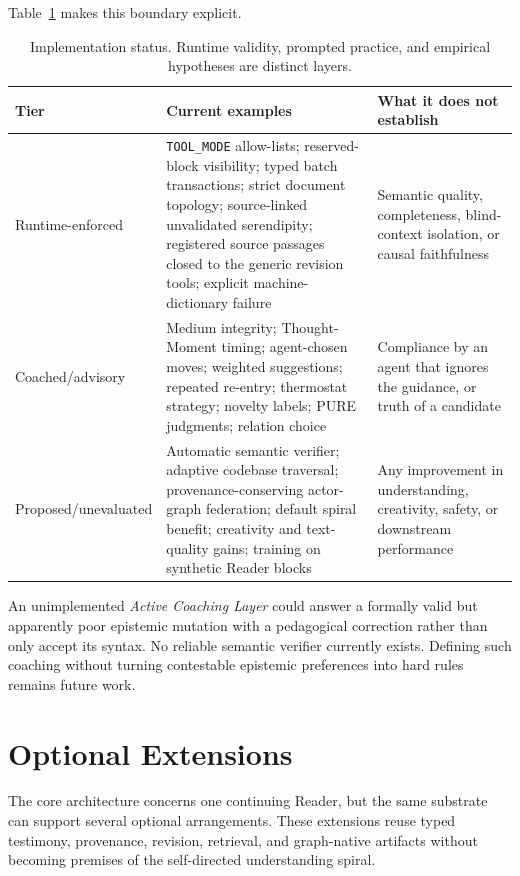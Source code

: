 Table~\ref{tab:implementation-status} makes this boundary explicit.

\begin{table}[H]
\centering
\begin{tabularx}{\columnwidth}{lXX}
\toprule
\textbf{Tier} & \textbf{Current examples} & \textbf{What it does not establish} \\
\midrule
Runtime-enforced & \texttt{TOOL\_MODE} allow-lists; reserved-block visibility; typed batch transactions; strict document topology; source-linked unvalidated serendipity; registered source passages closed to the generic revision tools; explicit machine-dictionary failure & Semantic quality, completeness, blind-context isolation, or causal faithfulness \\
Coached/advisory & Medium integrity; Thought-Moment timing; agent-chosen moves; weighted suggestions; repeated re-entry; thermostat strategy; novelty labels; PURE judgments; relation choice & Compliance by an agent that ignores the guidance, or truth of a candidate \\
Proposed/unevaluated & Automatic semantic verifier; adaptive codebase traversal; provenance-conserving actor-graph federation; default spiral benefit; creativity and text-quality gains; training on synthetic Reader blocks & Any improvement in understanding, creativity, safety, or downstream performance \\
\bottomrule
\end{tabularx}
\caption{Implementation status. Runtime validity, prompted practice, and empirical hypotheses are distinct layers.}
\label{tab:implementation-status}
\end{table}

An unimplemented \emph{Active Coaching Layer} could answer a formally valid but apparently poor epistemic mutation with a pedagogical correction rather than only accept its syntax. No reliable semantic verifier currently exists. Defining such coaching without turning contestable epistemic preferences into hard rules remains future work.

\section{Optional Extensions}
\label{sec:extensions}

The core architecture concerns one continuing Reader, but the same substrate can support several optional arrangements. These extensions reuse typed testimony, provenance, revision, retrieval, and graph-native artifacts without becoming premises of the self-directed understanding spiral.

